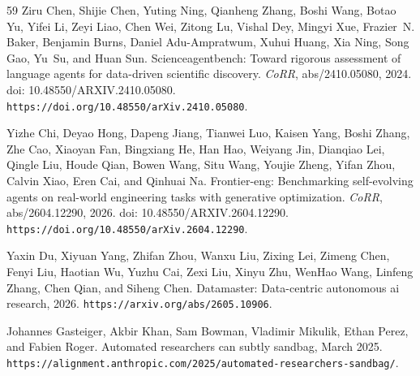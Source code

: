 \documentclass{llmxive}
\providecommand{\url}[1]{\texttt{#1}}
\providecommand{\doi}[1]{doi: #1}
\begin{document}
\begin{thebibliography}{59}
Ziru Chen, Shijie Chen, Yuting Ning, Qianheng Zhang, Boshi Wang, Botao Yu, Yifei Li, Zeyi Liao, Chen Wei, Zitong Lu, Vishal Dey, Mingyi Xue, Frazier~N. Baker, Benjamin Burns, Daniel Adu{-}Ampratwum, Xuhui Huang, Xia Ning, Song Gao, Yu~Su, and Huan Sun.
\newblock Scienceagentbench: Toward rigorous assessment of language agents for data-driven scientific discovery.
\newblock \emph{CoRR}, abs/2410.05080, 2024.
\newblock \doi{10.48550/ARXIV.2410.05080}.
\newblock \url{https://doi.org/10.48550/arXiv.2410.05080}.

Yizhe Chi, Deyao Hong, Dapeng Jiang, Tianwei Luo, Kaisen Yang, Boshi Zhang, Zhe Cao, Xiaoyan Fan, Bingxiang He, Han Hao, Weiyang Jin, Dianqiao Lei, Qingle Liu, Houde Qian, Bowen Wang, Situ Wang, Youjie Zheng, Yifan Zhou, Calvin Xiao, Eren Cai, and Qinhuai Na.
\newblock Frontier-eng: Benchmarking self-evolving agents on real-world engineering tasks with generative optimization.
\newblock \emph{CoRR}, abs/2604.12290, 2026.
\newblock \doi{10.48550/ARXIV.2604.12290}.
\newblock \url{https://doi.org/10.48550/arXiv.2604.12290}.

Yaxin Du, Xiyuan Yang, Zhifan Zhou, Wanxu Liu, Zixing Lei, Zimeng Chen, Fenyi Liu, Haotian Wu, Yuzhu Cai, Zexi Liu, Xinyu Zhu, WenHao Wang, Linfeng Zhang, Chen Qian, and Siheng Chen.
\newblock Datamaster: Data-centric autonomous ai research, 2026.
\newblock \url{https://arxiv.org/abs/2605.10906}.

Johannes Gasteiger, Akbir Khan, Sam Bowman, Vladimir Mikulik, Ethan Perez, and Fabien Roger.
\newblock Automated researchers can subtly sandbag, March 2025.
\newblock \url{https://alignment.anthropic.com/2025/automated-researchers-sandbag/}.


\end{thebibliography}
\end{document}
